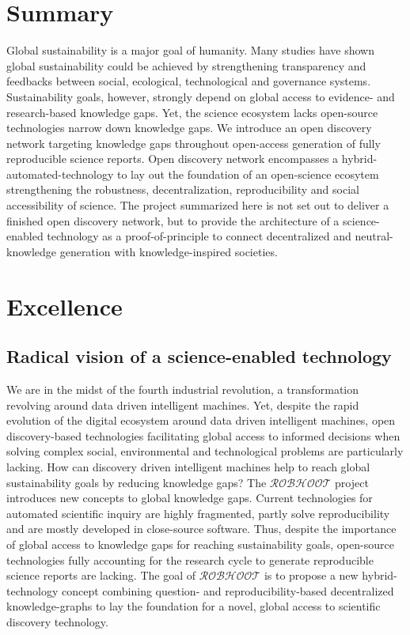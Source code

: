 \documentclass[12pt, a4paper]{article} %
\begin{document}
\section{{\bf Summary}} Global sustainability is a
  major goal of humanity. Many studies have shown global
  sustainability could be achieved by strengthening transparency and
  feedbacks between social, ecological, technological and governance
  systems. Sustainability goals, however, strongly depend on global
  access to evidence- and research-based knowledge gaps. Yet, the
  science ecosystem lacks open-source technologies narrow down
  knowledge gaps. We introduce an open discovery network targeting
  knowledge gaps throughout open-access generation of fully
  reproducible science reports. Open discovery network encompasses a
  hybrid-automated-technology to lay out the foundation of an
  open-science ecosytem strengthening the robustness,
  decentralization, reproducibility and social accessibility of
  science. The project summarized here is not set out to deliver a
  finished open discovery network, but to provide the architecture of
  a science-enabled technology as a proof-of-principle to connect
  decentralized and neutral-knowledge generation with
  knowledge-inspired societies.
\section{Excellence}
\subsection{Radical vision of a science-enabled technology}
We are in the midst of the fourth industrial revolution, a
transformation revolving around data driven intelligent machines. Yet,
despite the rapid evolution of the digital ecosystem around data
driven intelligent machines, open discovery-based technologies
facilitating global access to informed decisions when solving complex
social, environmental and technological problems are particularly
lacking. How can discovery driven intelligent machines help to reach global
sustainability goals by reducing knowledge gaps? The
$\mathcal{ROBHOOT}$ project introduces new concepts to global
knowledge gaps. Current technologies for automated scientific inquiry
are highly fragmented, partly solve reproducibility and are mostly
developed in close-source software. Thus, despite the importance of
global access to knowledge gaps for reaching sustainability goals,
open-source technologies fully accounting for the research cycle to
generate reproducible science reports are lacking. The goal of
$\mathcal{ROBHOOT}$ is to propose a new hybrid-technology concept
combining question- and reproducibility-based decentralized
knowledge-graphs to lay the foundation for a novel, global access to
scientific discovery technology.
\end{document}
